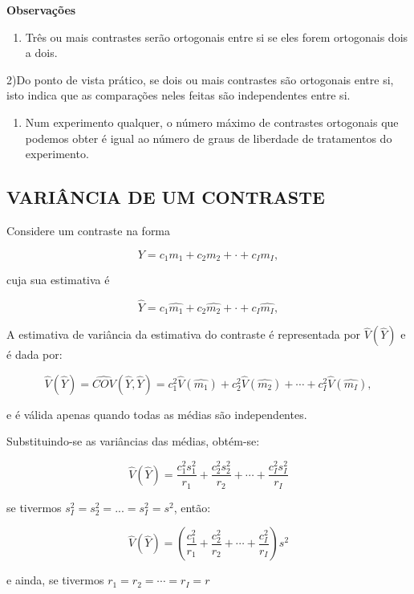 \documentclass[
]{book}
\providecommand{\tightlist}{%
  \setlength{\itemsep}{0pt}\setlength{\parskip}{0pt}}
\begin{document}
\textbf{Observações}

\begin{enumerate}
\def\labelenumi{\arabic{enumi})}
\tightlist
\item
  Três ou mais contrastes serão ortogonais entre si se eles forem ortogonais dois a dois.
\end{enumerate}

2)Do ponto de vista prático, se dois ou mais contrastes são ortogonais entre si, isto indica que as comparações neles feitas são independentes entre si.

\begin{enumerate}
\def\labelenumi{\arabic{enumi})}
\setcounter{enumi}{2}
\tightlist
\item
  Num experimento qualquer, o número máximo de contrastes ortogonais que podemos obter é igual ao número de graus de liberdade de tratamentos do experimento.
\end{enumerate}

\hypertarget{variuxe2ncia-de-um-contraste}{%
\subsection{VARIÂNCIA DE UM CONTRASTE}\label{variuxe2ncia-de-um-contraste}}

Considere um contraste na forma

\[
Y= c_1m_1+c_2m_2+ \cdot + c_Im_I,
\]

cuja sua estimativa é

\[
\hat{Y}= c_1\hat{m_1}+c_2\hat{m_2}+ \cdot + c_I\hat{m_I},
\]

A estimativa de variância da estimativa do contraste é representada por \(\hat{V}(\hat{Y})\) e é dada por:

\[
\hat{V}(\hat{Y}) = \hat{COV}(\hat{Y},\hat{Y}) = c^2_1\hat{V}(\hat{m_1}) + c^2_2\hat{V}(\hat{m_2}) + \cdots + c^2_I\hat{V}(\hat{m_I}),
\]

e é válida apenas quando todas as médias são independentes.

Substituindo-se as variâncias das médias, obtém-se:

\[
\hat{V}(\hat{Y}) = \frac{c_1^2s_1^2}{r_1} + \frac{c_2^2s_2^2}{r_2} + \cdots + \frac{c_I^2s_I^2}{r_I}
\]

se tivermos \(s_I^2=s_2^2= ... = s_I^2 = s^2\), então:

\[
\hat{V}(\hat{Y}) = \left( \frac{c^2_1}{r_1} + \frac{c_2^2}{r_2} + \cdots + \frac{c^2_I}{r_I} \right) s^2
\]

e ainda, se tivermos \(r_1 = r_2 = \cdots = r_I = r\)
\end{document}
